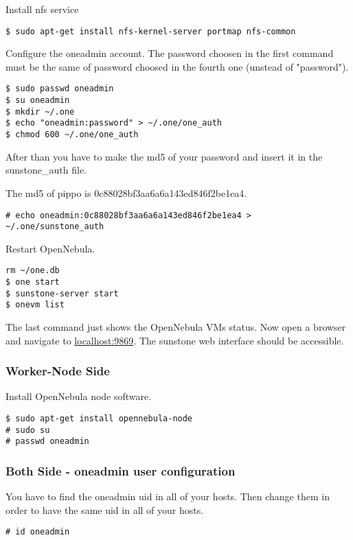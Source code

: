 \documentclass[11pt,a4paper]{article}
\begin{document}
Install nfs service
\begin{lstlisting}
$ sudo apt-get install nfs-kernel-server portmap nfs-common
\end{lstlisting}

Configure the oneadmin account. The password choosen in the first command must be the same of password choosed in the fourth one (unstead of "password").
\begin{lstlisting}
$ sudo passwd oneadmin
$ su oneadmin
$ mkdir ~/.one
$ echo "oneadmin:password" > ~/.one/one_auth
$ chmod 600 ~/.one/one_auth
\end{lstlisting}

After than you have to make the md5 of your password and insert it in the sunstone\_auth file.

The md5 of pippo is 0c88028bf3aa6a6a143ed846f2be1ea4.

\begin{lstlisting}
# echo oneadmin:0c88028bf3aa6a6a143ed846f2be1ea4 > ~/.one/sunstone_auth
\end{lstlisting}

Restart OpenNebula.

\begin{lstlisting}
rm ~/one.db
$ one start
$ sunstone-server start
$ onevm list
\end{lstlisting}

The last command just shows the OpenNebula VMs status.
Now open a browser and navigate to \url{localhost:9869}. The sunstone web interface should be accessible.  

\subsubsection{Worker-Node Side}

Install OpenNebula node software.

\begin{lstlisting}
$ sudo apt-get install opennebula-node
# sudo su
# passwd oneadmin
\end{lstlisting}
\subsubsection{Both Side - oneadmin user configuration}

You have to find the oneadmin uid in all of your hosts. Then change them in order to have the same uid in all of your hosts.

\begin{lstlisting}
# id oneadmin
\end{lstlisting}
\end{document}
